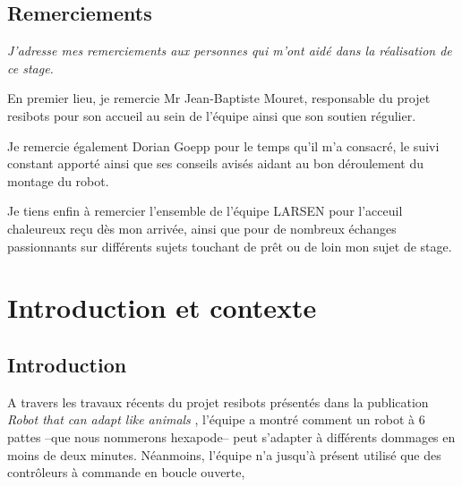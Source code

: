 \documentclass{tnreport}
\begin{document}
\maketitle
{}


\cleardoublepage

\makesecondtitle

\section*{Remerciements}

{\em
J'adresse mes remerciements aux personnes qui m'ont aidé dans la réalisation de ce stage.

En premier lieu, je remercie Mr Jean-Baptiste Mouret, responsable du projet resibots pour son accueil au sein de l'équipe ainsi que son soutien régulier. 

Je remercie également Dorian Goepp pour le temps qu'il m'a consacré, le suivi constant apporté ainsi que ses conseils avisés aidant au bon déroulement du montage du robot.

Je tiens enfin à remercier l'ensemble de l'équipe \gls{LARSEN} pour l'acceuil chaleureux reçu dès mon arrivée, ainsi que pour de nombreux échanges passionnants sur différents sujets touchant de prêt ou de loin mon sujet de stage.
}

\hspace{4cm}

\cleardoublepage

\renewcommand{\baselinestretch}{0.5}\normalsize
\tableofcontents
\renewcommand{\baselinestretch}{1.1}\normalsize
\cleardoublepage

\setcounter{page}{1}

\chapter{Introduction et contexte}
\section{Introduction}

A travers les travaux récents du projet resibots présentés dans la publication \textit{Robot that can adapt like animals} \cite{cully_robots_2015}, l'équipe a montré comment un robot à 6 pattes --que nous nommerons hexapode-- peut s'adapter à différents dommages en moins de deux minutes. Néanmoins, l'équipe n'a jusqu'à présent utilisé que des contrôleurs à commande en boucle ouverte, 
\end{document}

